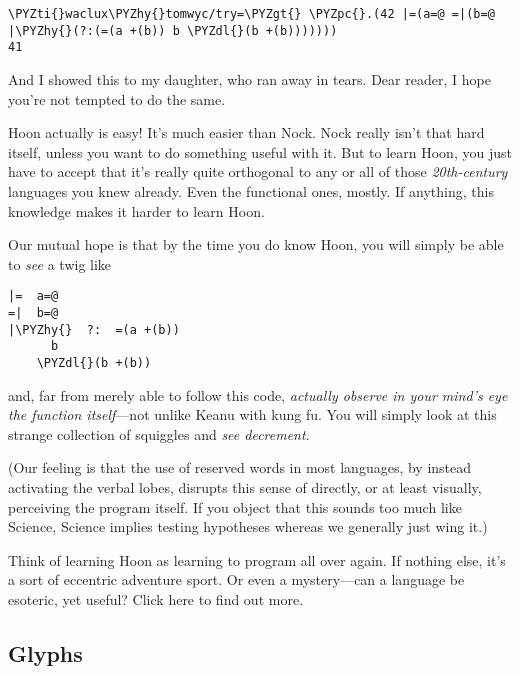 \begin{framed_shaded}
\begin{Verbatim}[fontsize=\relsize{-2.5},fontseries=b,commandchars=\\\{\}]
\PYZti{}waclux\PYZhy{}tomwyc/try=\PYZgt{} \PYZpc{}.(42 |=(a=@ =|(b=@ |\PYZhy{}(?:(=(a +(b)) b \PYZdl{}(b +(b)))))))
41
\end{Verbatim}
\end{framed_shaded}
And I showed this to my daughter, who ran away in tears.  Dear
reader, I hope you're not tempted to do the same.

Hoon actually is easy!  It's much easier than Nock.  Nock really
isn't that hard itself, unless you want to do something useful
with it.  But to learn Hoon, you just have to accept that it's
really quite orthogonal to any or all of those \emph{20th-century}
languages you knew already.  Even the functional ones, mostly.
If anything, this knowledge makes it harder to learn Hoon.

Our mutual hope is that by the time you do know Hoon, you will
simply be able to \emph{see} a twig like

\begin{framed_shaded}
\begin{Verbatim}[fontsize=\relsize{-2.5},fontseries=b,commandchars=\\\{\}]
|=  a=@
=|  b=@
|\PYZhy{}  ?:  =(a +(b))
      b
    \PYZdl{}(b +(b))
\end{Verbatim}
\end{framed_shaded}
and, far from merely able to follow this code, \emph{actually observe
in your mind's eye the function itself}---not unlike Keanu with
kung fu.  You will simply look at this strange collection of
squiggles and \emph{see decrement}.

(Our feeling is that the use of reserved words in most languages,
by instead activating the verbal lobes, disrupts this sense of
directly, or at least visually, perceiving the program itself.
If you object that this sounds too much like Science, Science
implies testing hypotheses whereas we generally just wing it.)

Think of learning Hoon as learning to program all over again.  If
nothing else, it's a sort of eccentric adventure sport.  Or even
a mystery---can a language be esoteric, yet useful?  Click here
to find out more.

\subsection{Glyphs}

